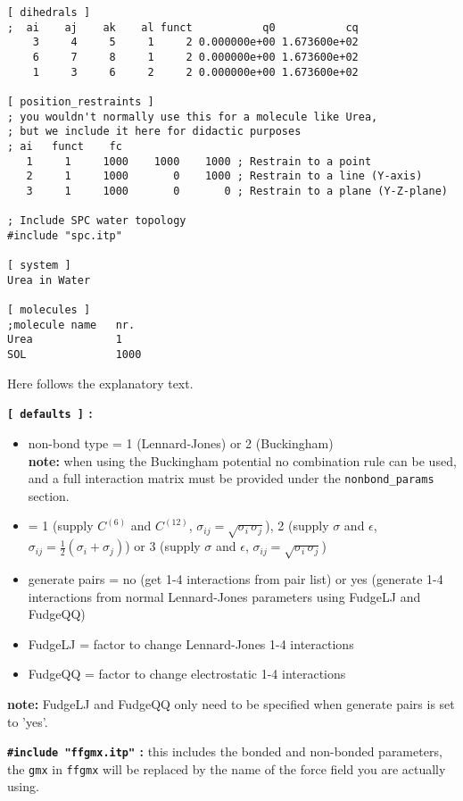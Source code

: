 {\begin{verbatim}
[ dihedrals ]
;  ai    aj    ak    al funct           q0           cq
    3     4     5     1     2 0.000000e+00 1.673600e+02 
    6     7     8     1     2 0.000000e+00 1.673600e+02 
    1     3     6     2     2 0.000000e+00 1.673600e+02 
 
[ position_restraints ]
; you wouldn't normally use this for a molecule like Urea,
; but we include it here for didactic purposes
; ai   funct    fc
   1     1     1000    1000    1000 ; Restrain to a point
   2     1     1000       0    1000 ; Restrain to a line (Y-axis)
   3     1     1000       0       0 ; Restrain to a plane (Y-Z-plane)

; Include SPC water topology
#include "spc.itp"

[ system ]
Urea in Water

[ molecules ]
;molecule name   nr.
Urea             1
SOL              1000
\end{verbatim}}

Here follows the explanatory text.

{\bf {\tt [~defaults~]} :}
\begin{itemize}
\item non-bond type = 1 (Lennard-Jones) or 2 (Buckingham)\\
{\bf note:} when using the Buckingham potential no combination rule can
be used, and a full interaction matrix must be provided under the 
{\tt nonbond\_params} section.
\item {} = 
1 (supply $C^{(6)}$ and $C^{(12)}$,
$\sigma_{ij}=\sqrt{\sigma_i\,\sigma_j}$),
2 (supply $\sigma$ and $\epsilon$,
$\sigma_{ij}=\frac{1}{2}(\sigma_i+\sigma_j)$) or
3 (supply $\sigma$ and $\epsilon$, $\sigma_{ij}=\sqrt{\sigma_i\,\sigma_j}$)
\item generate pairs = no (get 1-4 interactions from pair list) or yes
(generate 1-4 interactions from normal Lennard-Jones parameters using
FudgeLJ and FudgeQQ)
\item FudgeLJ = factor to change Lennard-Jones 1-4 interactions
\item FudgeQQ = factor to change electrostatic 1-4 interactions
\end{itemize}
{\bf note:} FudgeLJ and FudgeQQ only need to be specified when
generate pairs is set to 'yes'.

%

{\bf {\tt \#include "ffgmx.itp"} :} this includes the bonded and
non-bonded {\gromacs} parameters, the {\tt gmx} in {\tt ffgmx} will be
replaced by the name of the force field you are actually using.

